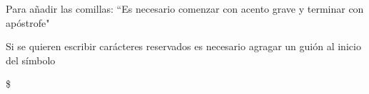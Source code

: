 \documentclass{article}
\begin{document}
	Para añadir las comillas: ``Es necesario comenzar con acento grave y terminar con apóstrofe"
	
	Si se quieren escribir carácteres reservados es necesario agragar un guión al inicio del símbolo
	
	\$
\end{document}
